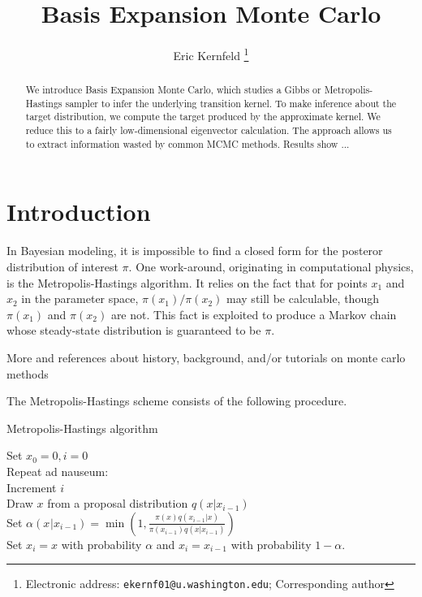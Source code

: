 \documentclass{article}
\begin{document}
\title{Basis Expansion Monte Carlo}

\author{Eric Kernfeld
  \thanks{Electronic address: \texttt{ekernf01@u.washington.edu}; Corresponding author}}
\maketitle

\begin{abstract}
We introduce Basis Expansion Monte Carlo, which studies a Gibbs or Metropolis-Hastings sampler to infer the underlying transition kernel. To make inference about the target distribution, we compute the target produced by the approximate kernel. We reduce this to a fairly low-dimensional eigenvector calculation. The approach allows us to extract information wasted by common MCMC methods. Results show ...
\end{abstract}


\section{Introduction}
In Bayesian modeling, it is impossible to find a closed form for the posteror distribution of interest $\pi$. One work-around, originating in computational physics, is the Metropolis-Hastings algorithm. It relies on the fact that for points $x_1$ and $x_2$ in the parameter space, $\pi(x_1)/\pi(x_2)$ may still be calculable, though $\pi(x_1)$ and $\pi(x_2)$ are not. This fact is exploited to produce a Markov chain whose steady-state distribution is guaranteed to be $\pi$. 

More and references about history, background, and/or tutorials on monte carlo methods



The Metropolis-Hastings scheme consists of the following procedure.

\begin{algorithm}[h]
\caption{Metropolis-Hastings algorithm}
Set $x_0 = 0, i=0$\\
Repeat ad nauseum:\\
\Indp
Increment $i$\\
Draw $x$ from a proposal distribution $q(x|x_{i-1})$\\
Set $\alpha(x_{}|x_{i-1}) = \min(1, \frac{\pi(x)q(x_{i-1}|x)}{\pi(x_{i-1})q(x|x_{i-1})})$\\
Set $x_i = x$ with probability $\alpha$ and $x_i = x_{i-1}$ with probability $1 - \alpha$.\\
\end{algorithm}
\end{document}
